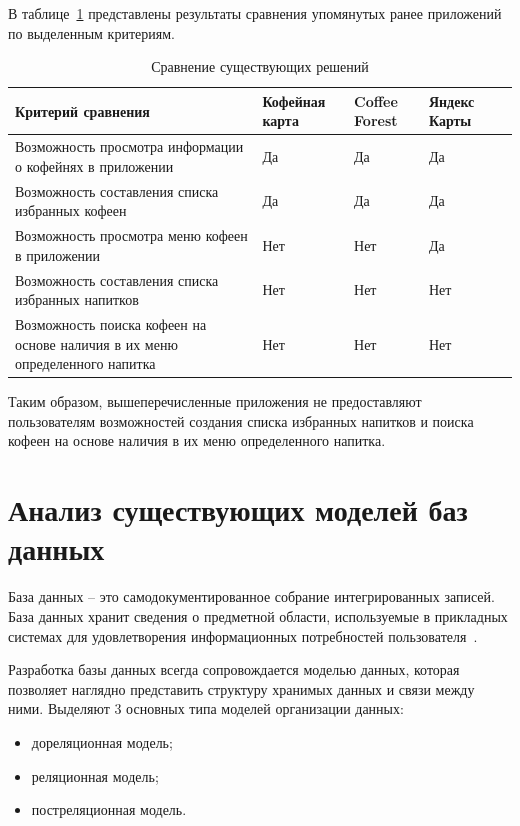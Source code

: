 В таблице~\ref{pop_apps} представлены результаты сравнения упомянутых ранее приложений по выделенным критериям.

\newpage
\begin{table}[ht]
	\begin{center}
		\begin{threeparttable}
			\caption{\label{pop_apps} Сравнение существующих решений}
			\begin{tabular}{|p{6cm}|p{3cm}|p{2cm}|p{2cm}|c|}
				\hline
				\textbf{Критерий сравнения} & \textbf{Кофейная карта} & \textbf{Coffee Forest} & \textbf{Яндекс Карты} \\ \hline
				Возможность просмотра информации о кофейнях в приложении & Да & Да & Да \\ \hline
				Возможность составления списка избранных кофеен & Да & Да & Да \\ \hline
				Возможность просмотра меню кофеен в приложении  & Нет & Нет & Да \\ \hline
				Возможность составления списка избранных напитков & Нет & Нет & Нет \\ \hline
				Возможность поиска кофеен на основе наличия в их меню определенного напитка & Нет & Нет & Нет \\ \hline
			\end{tabular}
		\end{threeparttable}
	\end{center}
\end{table}

Таким образом, вышеперечисленные приложения не предоставляют пользователям возможностей создания списка избранных напитков и поиска кофеен на основе наличия в их меню определенного напитка.

\section{Анализ существующих моделей баз данных}
База данных -- это самодокументированное собрание интегрированных записей. База данных хранит сведения о предметной области, используемые в прикладных системах для удовлетворения информационных потребностей пользователя~\cite{struzhkin}.


Разработка базы данных всегда сопровождается моделью данных, которая позволяет наглядно представить структуру хранимых данных и связи между ними. Выделяют 3 основных типа моделей организации данных:

\begin{itemize}
	\item дореляционная модель;
	\item реляционная модель;
	\item постреляционная модель.
\end{itemize}

